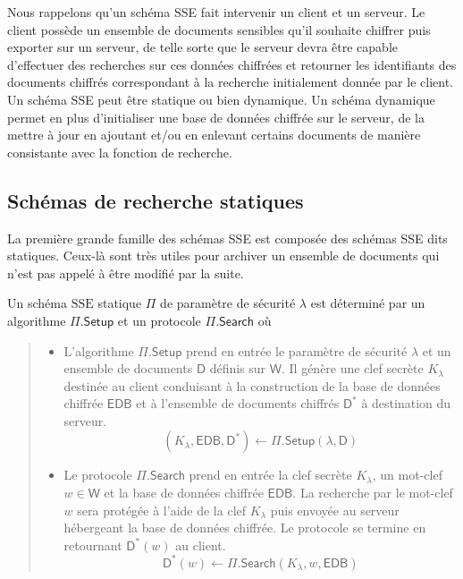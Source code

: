 Nous rappelons qu'un schéma SSE fait intervenir un client et un serveur. Le
client possède un ensemble de documents sensibles qu'il souhaite chiffrer puis
exporter sur un serveur, de telle sorte que le serveur devra être capable
d'effectuer des recherches sur ces données chiffrées et retourner les
identifiants des documents chiffrés correspondant à la recherche initialement
donnée par le client. Un schéma SSE peut être statique ou bien dynamique. Un
schéma dynamique permet en plus d'initialiser une base de données chiffrée sur
le serveur, de la mettre à jour en ajoutant et/ou en enlevant certains documents
de manière consistante avec la fonction de recherche.

\subsection{Schémas de recherche statiques}
La première grande famille des schémas SSE est composée des schémas SSE dits
statiques. Ceux-là sont très utiles pour archiver un ensemble de documents qui
n'est pas appelé à être modifié par la suite.

\begin{defi}
Un schéma $\mathrm{SSE}$ statique $\mathsf{\Pi}$ de paramètre de sécurité
$\lambda$ est déterminé par un algorithme $\mathsf{\Pi}.\mathsf{Setup}$ et un
protocole $\mathsf{\Pi}.\mathsf{Search}$ où\\
\begin{quote}
\begin{itemize}
\item L'algorithme $\mathsf{\Pi}.\mathsf{Setup}$ prend en entrée le paramètre de
sécurité $\lambda$ et un ensemble de documents $\mathsf{D}$ définis sur
$\mathsf{W}$. Il génère une clef secrète $K_\lambda$ destinée au client
conduisant à la construction de la base de données chiffrée $\mathsf{EDB}$ et à
l'ensemble de documents chiffrés $\mathsf{D}^*$ à destination du serveur.
\begin{displaymath}
(K_\lambda,\mathsf{EDB},\mathsf{D}^*) \leftarrow \mathsf{\Pi}.\mathsf{Setup}
(\lambda,\mathsf{D})
\end{displaymath}
\item Le protocole $\mathsf{\Pi}.\mathsf{Search}$ prend en entrée la clef
secrète $K_\lambda$, un mot-clef $w \in \mathsf{W}$ et la base de données
chiffrée $\mathsf{EDB}$. La recherche par le mot-clef $w$ sera protégée à l'aide
de la clef $K_\lambda$ puis envoyée au serveur hébergeant la base de données
chiffrée. Le protocole se termine en retournant $\mathsf{D}^*(w)$ au client.
\begin{displaymath}
\mathsf{D}^*(w) \leftarrow \mathsf{\Pi}.\mathsf{Search}(K_\lambda,w,\mathsf{EDB})
\end{displaymath}
\end{itemize}
\end{quote}
\end{defi}

